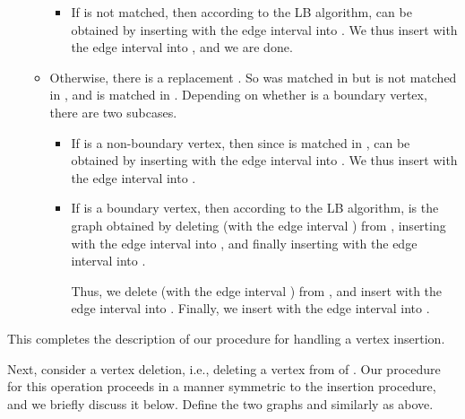\documentclass[11pt]{article}
\begin{document}
\begin{itemize}
\begin{itemize}
\begin{itemize}
\item
If  is not matched, then according to the LB algorithm,  can be
obtained by inserting  with the edge interval  into .
We thus insert  with the edge interval  into , and we are done.

\end{itemize}

\item
Otherwise, there is a replacement . So 
was matched in  but is not matched in , and  is
matched in . Depending on whether  is a boundary vertex, there are two
subcases.

\begin{itemize}
\item
If  is a non-boundary vertex, then since  is
matched in ,  can be
obtained by inserting  with the edge interval  into .
We thus insert  with the edge interval  into .


\item
If  is a boundary vertex, then according to the LB algorithm,
 is the graph obtained by deleting  (with the edge interval
) from , inserting  with the edge interval  into
, and finally inserting  with the edge interval  into .

Thus, we delete  (with the edge interval ) from , and insert
 with the edge interval  into .
Finally, we insert  with the edge interval  into .
\end{itemize}

\end{itemize}
\end{itemize}

This completes the description of our procedure for handling a vertex insertion.

Next, consider a vertex deletion, i.e., deleting a vertex  from  of
. Our procedure for this operation proceeds in a manner symmetric to the insertion
procedure, and we briefly discuss it below. Define the two graphs  and  similarly as above.
\end{document}
